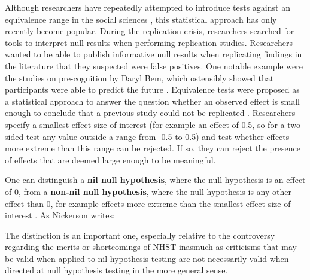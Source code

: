 \documentclass[
  oneside]{krantz}
\renewenvironment{quote}{\begin{VF}}{\end{VF}}
\begin{document}
Although researchers have repeatedly attempted to introduce tests against an equivalence range in the social sciences \citep{cribbie_recommendations_2004, levine_communication_2008, hoenig_abuse_2001, rogers_using_1993, quertemont_how_2011}, this statistical approach has only recently become popular. During the replication crisis, researchers searched for tools to interpret null results when performing replication studies. Researchers wanted to be able to publish informative null results when replicating findings in the literature that they suspected were false positives. One notable example were the studies on pre-cognition by Daryl Bem, which ostensibly showed that participants were able to predict the future \citep{bem_feeling_2011}. Equivalence tests were proposed as a statistical approach to answer the question whether an observed effect is small enough to conclude that a previous study could not be replicated \citep{anderson_theres_2016, lakens_equivalence_2017, simonsohn_small_2015}. Researchers specify a smallest effect size of interest (for example an effect of 0.5, so for a two-sided test any value outside a range from -0.5 to 0.5) and test whether effects more extreme than this range can be rejected. If so, they can reject the presence of effects that are deemed large enough to be meaningful.

One can distinguish a \textbf{nil null hypothesis}, where the null hypothesis is an effect of 0, from a \textbf{non-nil null hypothesis}, where the null hypothesis is any other effect than 0, for example effects more extreme than the smallest effect size of interest \citep{nickerson_null_2000}. As Nickerson writes:

\begin{quote}
The distinction is an important one, especially relative to the controversy regarding the merits or shortcomings of NHST inasmuch as criticisms that may be valid when applied to nil hypothesis testing are not necessarily valid when directed at null hypothesis testing in the more general sense.
\end{quote}
\end{document}
